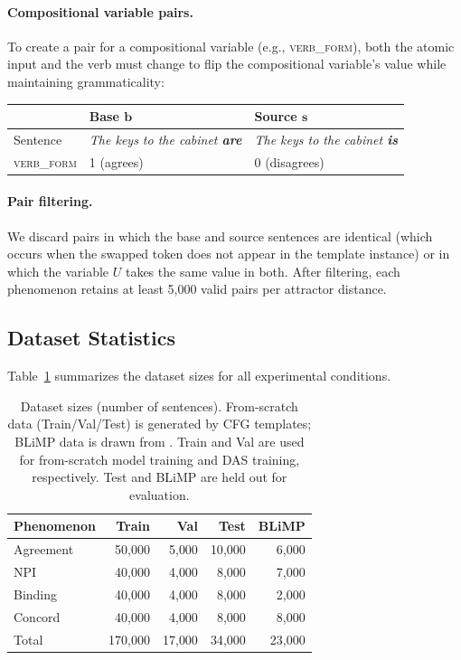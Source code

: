\documentclass[11pt]{article}
\begin{document}
\paragraph{Compositional variable pairs.}
To create a pair for a compositional variable (e.g., \textsc{verb\_form}), both the atomic input and the verb must change to flip the compositional variable's value while maintaining grammaticality:
\begin{center}\scriptsize
\begin{tabular}{@{}lll@{}}
\toprule
& \textbf{Base} $\mathbf{b}$ & \textbf{Source} $\mathbf{s}$ \\
\midrule
Sentence & \textit{The keys to the cabinet \textbf{are}} & \textit{The keys to the cabinet \textbf{is}} \\
\textsc{verb\_form} & 1 (agrees) & 0 (disagrees) \\
\bottomrule
\end{tabular}
\end{center}

\paragraph{Pair filtering.}
We discard pairs in which the base and source sentences are identical (which occurs when the swapped token does not appear in the template instance) or in which the variable $U$ takes the same value in both.
After filtering, each phenomenon retains at least 5{,}000 valid pairs per attractor distance.

\subsection{Dataset Statistics}
\label{app:data-stats}

Table~\ref{tab:data-stats} summarizes the dataset sizes for all experimental conditions.

\begin{table}[t]
\centering\footnotesize
\setlength{\tabcolsep}{3pt}
\begin{tabular}{@{}lrrrr@{}}
\toprule
\textbf{Phenomenon} & \textbf{Train} & \textbf{Val} & \textbf{Test} & \textbf{BLiMP} \\
\midrule
Agreement & 50{,}000 & 5{,}000 & 10{,}000 & 6{,}000 \\
NPI       & 40{,}000 & 4{,}000 & 8{,}000 & 7{,}000 \\
Binding   & 40{,}000 & 4{,}000 & 8{,}000 & 2{,}000 \\
Concord   & 40{,}000 & 4{,}000 & 8{,}000 & 8{,}000 \\
\midrule
Total     & 170{,}000 & 17{,}000 & 34{,}000 & 23{,}000 \\
\bottomrule
\end{tabular}
\caption{Dataset sizes (number of sentences). From-scratch data (Train/Val/Test) is generated by CFG templates; BLiMP data is drawn from \citet{warstadt2020blimp}. Train and Val are used for from-scratch model training and DAS training, respectively. Test and BLiMP are held out for evaluation.}
\label{tab:data-stats}
\end{table}
\end{document}
